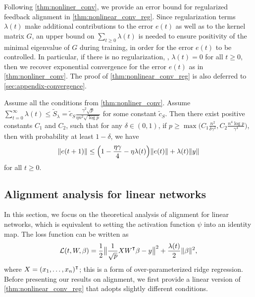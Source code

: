 Following \cref{thm:nonliner_conv}, we provide an error bound for regularized feedback alignment in \cref{thm:nonlinear_conv_reg}. Since regularization terms $\lambda(t)$ make additional contributions to the error $e(t)$ as well as to the kernel matrix $G$, an upper bound on $\sum_{t\geq 0}\lambda(t)$ is needed to ensure positivity of the minimal eigenvalue of $G$ during training, in order for the error $e(t)$ to be controlled. In particular, if there is no regularization, \ie, $\lambda(t)=0$ for all $t\geq 0$, then we recover exponential convergence for the error $e(t)$ as in \cref{thm:nonliner_conv}. The proof of \cref{thm:nonlinear_conv_reg} is also deferred to \cref{sec:appendix-convergence}.

\begin{theorem}
\label{thm:nonlinear_conv_reg}
Assume all the conditions from \cref{thm:nonliner_conv}. Assume $\sum_{t=0}^\infty \lambda(t) \leq  \tilde{S}_\lambda = \tilde{c}_{S}\frac{\gamma^2\sqrt{p}}{\eta n^2\sqrt{\log p}}$ for some constant $\tilde{c}_{S}$. Then there exist positive constants $C_1$ and $C_2$, such that for any $\delta\in(0,1)$, if $p \geq \max\bigl(C_1\frac{n^2}{\delta\gamma^2}, C_2\frac{n^4\log p}{\gamma^4}\bigr)$, then with probability at least $1-\delta$, we have
\begin{equation}
\label{eq:conv_reg}
    \|e(t+1)\| \leq \Bigl(1-\frac{\eta\gamma}{4}-\eta\lambda(t)\Bigr)\|e(t)\|+\lambda(t)\|y\|
\end{equation}
for all $t\geq 0$.
\end{theorem}



\subsection{Alignment analysis for linear networks}
In this section, we focus on the theoretical analysis of alignment for linear networks, which is equivalent to setting the activation function $\psi$ into an identity map. The loss function can be written as
\begin{equation*}
    \Loss(t,W,\beta) = \frac{1}{2}\big\|\frac{1}{\sqrt{p}}XW\transpose\beta-y\big\|^2+\frac{\lambda(t)}{2}\|\beta\|^2,
\end{equation*}
where $X = (x_1,\ldots,x_n)\transpose$; this is a form of over-parameterized ridge regression.
Before presenting our results on alignment, we first provide a linear version of \cref{thm:nonlinear_conv_reg} that adopts slightly different conditions.

